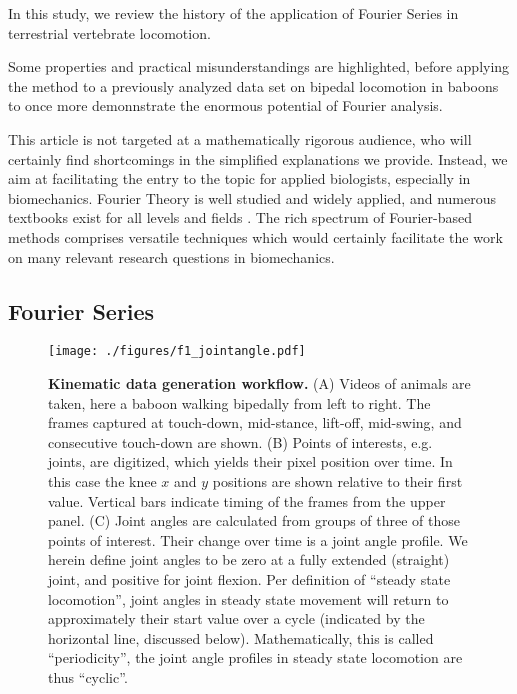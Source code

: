 \documentclass[10pt,a4paper]{article}
\begin{document}
In this study, we review the history of the application of Fourier Series in terrestrial vertebrate locomotion.

Some properties and practical misunderstandings are highlighted, before applying the method to a previously analyzed data set on bipedal locomotion in baboons \citep{Druelle2021} to once more demonnstrate the enormous potential of Fourier analysis.

This article is not targeted at a mathematically rigorous audience, who will certainly find shortcomings in the simplified explanations we provide.
Instead, we aim at facilitating the entry to the topic for applied biologists, especially in biomechanics.
Fourier Theory is well studied and widely applied, and numerous textbooks exist for all levels and fields \citep[\textit{cf.}][]{Bracewell2000,Osgood2019}.
The rich spectrum of Fourier-based methods comprises versatile techniques which would certainly facilitate the work on many relevant research questions in biomechanics.


\subsection{Fourier Series}
\label{sec:orgaa83262}

\begin{figure}[pt]
\centering
\texttt{[image: ./figures/f1\_jointangle.pdf]}
\caption{\label{fig:jointangle}\textbf{Kinematic data generation workflow.} (A) Videos of animals are taken, here a baboon walking bipedally from left to right. The frames captured at touch-down, mid-stance, lift-off, mid-swing, and consecutive touch-down are shown. (B) Points of interests, e.g. joints, are digitized, which yields their pixel position over time. In this case the knee \(x\) and \(y\) positions are shown relative to their first value. Vertical bars indicate timing of the frames from the upper panel. (C) Joint angles are calculated from groups of three of those points of interest. Their change over time is a joint angle profile. We herein define joint angles to be zero at a fully extended (straight) joint, and positive for joint flexion. Per definition of ``steady state locomotion'', joint angles in steady state movement will return to approximately their start value over a cycle (indicated by the horizontal line, discussed below). Mathematically, this is called ``periodicity'', the joint angle profiles in steady state locomotion are thus ``cyclic''.}
\end{figure}
\end{document}
